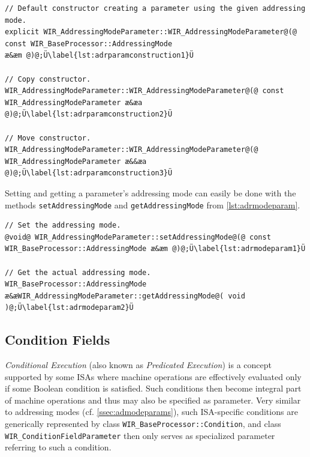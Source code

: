 \begin{lstlisting}[style=code,float=ht,caption={Constructors of Class \texttt{WIR\_AddressingModeParameter}},label=lst:adrparamconstruction]
// Default constructor creating a parameter using the given addressing mode.
explicit WIR_AddressingModeParameter::WIR_AddressingModeParameter@(@ const WIR_BaseProcessor::AddressingMode                                                                   æ&æm @)@;Ü\label{lst:adrparamconstruction1}Ü

// Copy constructor.
WIR_AddressingModeParameter::WIR_AddressingModeParameter@(@ const WIR_AddressingModeParameter æ&æa @)@;Ü\label{lst:adrparamconstruction2}Ü

// Move constructor.
WIR_AddressingModeParameter::WIR_AddressingModeParameter@(@ WIR_AddressingModeParameter æ&&æa @)@;Ü\label{lst:adrparamconstruction3}Ü
\end{lstlisting}

Setting and getting a parameter's addressing mode can easily be done with the methods \texttt{setAddressingMode} and \texttt{getAddressingMode} from \cref{lst:adrmodeparam}.

\begin{lstlisting}[style=code,float=t,caption={Mode Handling of Class \texttt{WIR\_AddressingModeParameter}},label=lst:adrmodeparam]
// Set the addressing mode.
@void@ WIR_AddressingModeParameter::setAddressingMode@(@ const WIR_BaseProcessor::AddressingMode æ&æm @)@;Ü\label{lst:adrmodeparam1}Ü

// Get the actual addressing mode.
WIR_BaseProcessor::AddressingMode æ&æWIR_AddressingModeParameter::getAddressingMode@( void )@;Ü\label{lst:adrmodeparam2}Ü
\end{lstlisting}


\subsection{Condition Fields}
\label{ssec:condparams}

\emph{Conditional Execution} (also known as \emph{Predicated Execution}) is a concept supported by some \glspl{ISA} where machine operations are effectively evaluated only if some Boolean condition is satisfied.
Such conditions then become integral part of machine operations and thus may also be specified as parameter.
Very similar to addressing modes (cf. \cref{ssec:admodeparams}), such \gls{ISA}-specific conditions are generically represented by class \texttt{WIR\_BaseProcessor::Condi\-tion}, and class \texttt{WIR\_ConditionFieldParameter} then only serves as specialized parameter referring to such a condition.

